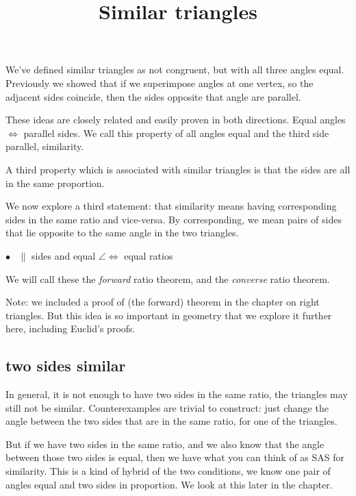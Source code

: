 \documentclass[11pt, oneside]{article}
\title{Similar triangles}
\date{}
\begin{document}
\maketitle
\Large


\label{sec:similarity_and_ratios}

We've defined similar triangles as not congruent, but with all three angles equal.  Previously we showed that if we superimpose angles at one vertex, so the adjacent sides coincide, then the sides opposite that angle are parallel.

These ideas are closely related and easily proven in both directions.  Equal angles $\iff$ parallel sides.  We call this property of all angles equal and the third side parallel, similarity.

A third property which is associated with similar triangles is that the sides are all in the same proportion.

We now explore a third statement:  that similarity means having corresponding sides in the same ratio and vice-versa.  By corresponding, we mean pairs of sides that lie opposite to the same angle in the two triangles.

$\bullet$ \ $\parallel$ sides and equal $\angle \iff$ equal ratios

We will call these the \emph{forward} ratio theorem, and the \emph{converse} ratio theorem.

Note:  we included a proof of (the forward) theorem in the chapter on right triangles.  But this idea is so important in geometry that we explore it further here, including Euclid's proofs.

\subsection*{two sides similar}

In general, it is not enough to have two sides in the same ratio, the triangles may still not be similar.  Counterexamples are trivial to construct:  just change the angle between the two sides that are in the same ratio, for one of the triangles.

But if we have two sides in the same ratio, and we also know that the angle between those two sides is equal, then we have what you can think of as SAS for similarity.  This is a kind of hybrid of the two conditions, we know one pair of angles equal and two sides in proportion.  We look at this later in the chapter.
 
\end{document}
